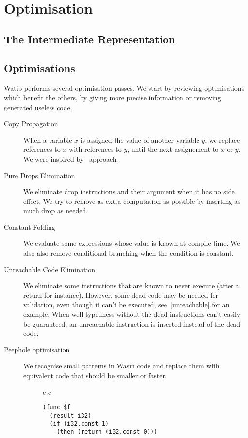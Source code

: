 \documentclass[10pt]{article}
\begin{document}
\section{Optimisation}\label{opt}
\subsection{The Intermediate Representation}\label{ir}
\subsection{Optimisations}
Watib performs several optimisation passes. We start by reviewing optimisations
which benefit the others, by giving more precise information or removing
generated useless code.
\begin{description}
  \item[Copy Propagation] When a variable $x$ is assigned the value of another
    variable $y$, we replace references to $x$ with references to $y$, until the
    next assignement to $x$ or $y$. We were inspired
    by~\cite[Section~12.5]{muchnick1997advanced} approach.
  \item[Pure Drops Elimination] We eliminate \textsf{drop} instructions and
    their argument when it has no side effect. We try to remove as extra
    computation as possible by inserting as much \textsf{drop} as needed.
  \item[Constant Folding] We evaluate some expressions whose value is known at
    compile time. We also also remove conditional branching when the condition
    is constant.
  \item[Unreachable Code Elimination] We eliminate some instructions that are
    known to never execute (after a \textsf{return} for instance). However, some
    dead code may be needed for validation, even though it can't be executed,
    see~\ref{unreachable} for an example. When well-typedness without the dead
    instructions can't easily be guaranteed, an \textsf{unreachable} instruction
    is inserted instead of the dead code.
  \item[Peephole optimisation] We recognise small patterns in Wasm code and
    replace them with equivalent code that should be smaller or faster.
\begin{figure}[h]
\centering
\begin{tabular}{c c}
\begin{minipage}{2.8in}
\begin{verbatim}
(func $f
  (result i32)
  (if (i32.const 1)
    (then (return (i32.const 0)))

\end{verbatim}
\end{minipage}
\end{tabular}
\end{figure}
\end{description}
\end{document}
